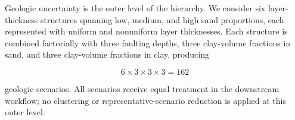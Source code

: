 Geologic uncertainty is the outer level of the hierarchy. We consider six
layer-thickness structures spanning low, medium, and high sand proportions,
each represented with uniform and nonuniform layer thicknesses. Each structure
is combined factorially with three faulting depths, three clay-volume
fractions in sand, and three clay-volume fractions in clay, producing

\begin{equation}
6\times3\times3\times3 = 162
\end{equation}

geologic scenarios. All scenarios receive equal treatment in the downstream
workflow; no clustering or representative-scenario reduction is applied at
this outer level.

